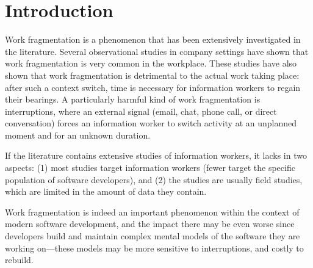 \documentclass[times]{smrauth}
\begin{document}
\section{Introduction}
% 
% 
% 
% 

Work fragmentation is a phenomenon that has been extensively investigated in the literature. Several observational studies in company settings have shown that work fragmentation is very common in the workplace. These studies have also shown that work fragmentation is detrimental to the actual work taking place: after such a context switch, time is necessary for information workers to regain their bearings. A particularly harmful kind of work fragmentation is interruptions, where an external signal (email, chat, phone call, or direct conversation) forces an information worker to switch activity at an unplanned moment and for an unknown duration.

If the literature contains extensive studies of information workers, it lacks in two aspects: (1) most studies target information workers (fewer target the specific population of software developers), and (2) the studies are usually field studies, which are limited in the amount of data they contain.

Work fragmentation is indeed an important phenomenon within the context of modern software development, and the impact there may be even worse since developers build and maintain complex mental models of the software they are working on---these models may be more sensitive to interruptions, and costly to rebuild. %
\end{document}
